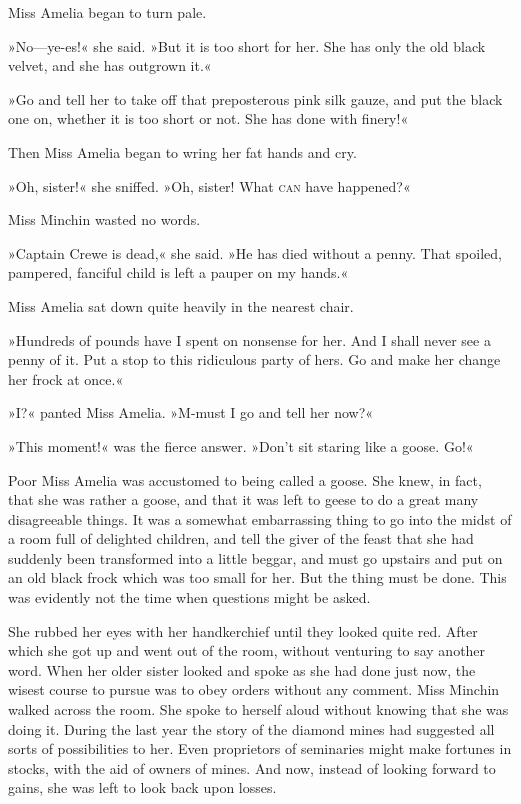 Miss Amelia began to turn pale.

»No—ye-es!« she said. »But it is too short for her. She has only the old black velvet, and she has outgrown it.«

»Go and tell her to take off that preposterous pink silk gauze, and put the black one on, whether it is too short or not. She has done with finery!«

Then Miss Amelia began to wring her fat hands and cry.

»Oh, sister!« she sniffed. »Oh, sister! What \textsc{can} have happened?«

Miss Minchin wasted no words.

»Captain Crewe is dead,« she said. »He has died without a penny. That spoiled, pampered, fanciful child is left a pauper on my hands.«

Miss Amelia sat down quite heavily in the nearest chair.

»Hundreds of pounds have I spent on nonsense for her. And I shall never see a penny of it. Put a stop to this ridiculous party of hers. Go and make her change her frock at once.«

»I?« panted Miss Amelia. »M-must I go and tell her now?«

»This moment!« was the fierce answer. »Don't sit staring like a goose. Go!«

Poor Miss Amelia was accustomed to being called a goose. She knew, in fact, that she was rather a goose, and that it was left to geese to do a great many disagreeable things. It was a somewhat embarrassing thing to go into the midst of a room full of delighted children, and tell the giver of the feast that she had suddenly been transformed into a little beggar, and must go upstairs and put on an old black frock which was too small for her. But the thing must be done. This was evidently not the time when questions might be asked.

She rubbed her eyes with her handkerchief until they looked quite red. After which she got up and went out of the room, without venturing to say another word. When her older sister looked and spoke as she had done just now, the wisest course to pursue was to obey orders without any comment. Miss Minchin walked across the room. She spoke to herself aloud without knowing that she was doing it. During the last year the story of the diamond mines had suggested all sorts of possibilities to her. Even proprietors of seminaries might make fortunes in stocks, with the aid of owners of mines. And now, instead of looking forward to gains, she was left to look back upon losses.

